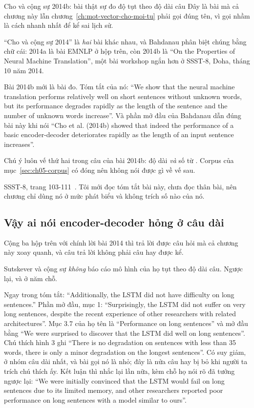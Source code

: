 \begin{bridge}{Cho và cộng sự 2014b: bài thật sự đo độ tụt theo độ dài câu}
Đây là bài mà cả chương này lẫn chương~\ref{ch:mot-vector-cho-moi-tu} phải gọi
đúng tên, vì gọi nhầm là cách nhanh nhất để kể sai lịch sử.

\enquote{Cho và cộng sự 2014} là \emph{hai} bài khác nhau, và Bahdanau phân biệt
chúng bằng chữ cái: 2014a là bài EMNLP ở hộp trên, còn 2014b là
\enquote{On the Properties of Neural Machine Translation}, một bài workshop
ngắn hơn ở SSST-8, Doha, tháng 10 năm 2014.

Bài 2014b mới là bài đo. Tóm tắt của nó: \enquote{We show that the neural
machine translation performs relatively well on short sentences without unknown
words, but its performance degrades rapidly as the length of the sentence and
the number of unknown words increase}. Và phần mở đầu của Bahdanau dẫn đúng bài
này khi nói \enquote{Cho et al. (2014b) showed that indeed the performance of a
basic encoder-decoder deteriorates rapidly as the length of an input sentence
increases}.

Chú ý luôn vế thứ hai trong câu của bài 2014b: độ dài \emph{và} số từ
. Corpus của mục~\ref{sec:ch05-corpus} có
 đóng nên không nói được gì về vế sau.

SSST-8, trang 103-111~\autocite{cho2014properties}. Tôi mới đọc tóm tắt bài này,
chưa đọc thân bài, nên chương chỉ dùng nó ở mức phát biểu và không trích số nào
của nó.
\end{bridge}

\subsection*{Vậy ai nói encoder-decoder hỏng ở câu dài}

%
Cộng ba hộp trên với chính lời bài 2014 thì trả lời được câu hỏi mà cả chương
này xoay quanh, và câu trả lời không phải câu hay được kể.

Sutskever và cộng sự \emph{không} báo cáo mô hình của họ tụt theo độ dài câu.
Ngược lại, và ở năm chỗ.

Ngay trong tóm tắt: \enquote{Additionally, the LSTM did not have difficulty on
long sentences.} Phần mở đầu, mục 1: \enquote{Surprisingly, the LSTM did not
suffer on very long sentences, despite the recent experience of other
researchers with related architectures}. Mục 3.7 của họ tên là
\enquote{Performance on long sentences}
và mở đầu bằng \enquote{We were surprised to discover that the LSTM did well on
long sentences}. Chú thích hình 3 ghi \enquote{There is no degradation on
sentences with less than 35 words, there is only a minor degradation on the
longest sentences}. Có suy giảm, ở nhóm câu dài nhất, và bài gọi nó là nhỏ; đây
là nửa câu hay bị bỏ khi người ta trích chú thích ấy. Kết luận thì nhắc lại lần
nữa, kèm chỗ họ nói rõ đã tưởng ngược lại: \enquote{We were
initially convinced that the LSTM would fail on long sentences due to its
limited memory, and other researchers reported poor performance on long
sentences with a model similar to ours}.

